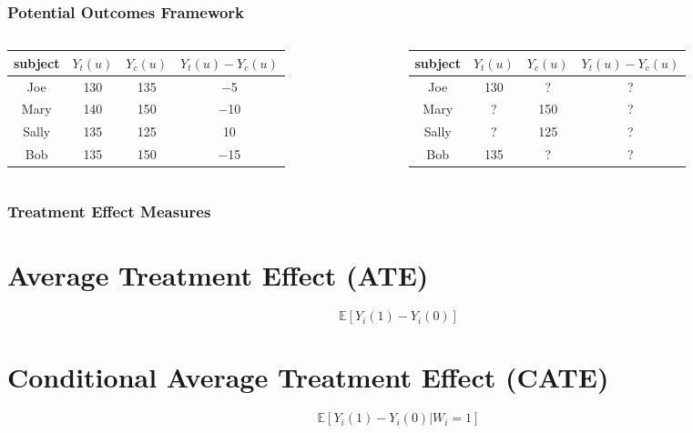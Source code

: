 \documentclass{beamer}
\begin{document}
\begin{frame}
	\frametitle{Potential Outcomes Framework}
	\begin{columns}
		\begin{column}{0.5 \textwidth}
		\begin{table}
			\centering
			\begin{tabularx}{\textwidth}{| c | c | c | c |} 
			\hline 
			\textbf{subject} & $ Y_{t}(u) $  & $ Y_{c}(u) $ & $ Y_{t}(u) - Y_{c}(u) $ \\
			\hline
				Joe    & 130     & 135    & −5 \\
				Mary   & 140     & 150    & −10 \\
				Sally  & 135     & 125    & 10 \\
				Bob    & 135     & 150    & −15 \\
			\hline
			\hline
			\end{tabularx}
		\end{table}
		\end{column}
		\begin{column}{0.5 \textwidth}
		\begin{table}
			\centering
			\begin{tabularx}{\textwidth}{| c | c | c | c |} 
			\hline 
			\textbf{subject} & $ Y_{t}(u) $  & $ Y_{c}(u) $ & $ Y_{t}(u) - Y_{c}(u) $ \\
			\hline
				Joe    & 130     & ? & ? \\
				Mary   & ? & 150    &  ? \\
				Sally  & ? & 125    &  ? \\
				Bob    & 135     & ? & ? \\
			\hline
			\hline
			\end{tabularx}
		\end{table}
		\end{column}
	\end{columns}	
\end{frame}

\begin{frame}
	\frametitle{Treatment Effect Measures}
	\section{Average Treatment Effect (ATE)}
	
	$$ \mathbb{E}[Y_i(1) - Y_i(0)] $$

	\section{Conditional Average Treatment Effect (CATE)}
	
	$$ \mathbb{E}[Y_i(1) - Y_i(0) | W_i = 1] $$
\end{frame}
\end{document}
